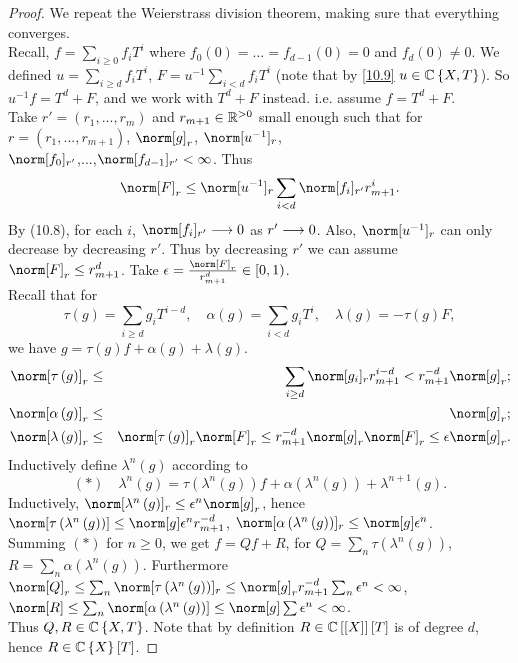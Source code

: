 \begin{proof}
We repeat the Weierstrass division theorem, making sure that everything
converges.\\
Recall, $f=\sum_{i\geq0}f_{i}T^{i}$ where $f_{0}\left(0\right)=...=f_{d-1}\left(0\right)=0$
and $f_{d}\left(0\right)\neq0$. We defined $u=\sum_{i\geq d}f_{i}T^{i}$,
$F=u^{-1}\sum_{i<d}f_{i}T^{i}$ (note that by \ref{10.9} $u\in\mathbb{C}\left\{ X,T\right\} $).
So $u^{-1}f=T^{d}+F$, and we work with $T^{d}+F$ instead. i.e. assume
$f=T^{d}+F$.\\
Take $r'=\left(r_{1},...,r_{m}\right)$ and $r_{m+1}\in\mathbb{R}^{>0}$ small
enough such that for $r=\left(r_{1},...,r_{m+1}\right)$, $\norm[g]_{r}$,
$\norm[u^{-1}]_{r}$, \\
$\norm[f_{0}]_{r'}$,...,$\norm[f_{d-1}]_{r'}<\infty$. Thus 
\[
\norm[F]_{r}\leq\norm[u^{-1}]_{r}\sum_{i<d}\norm[f_{i}]_{r'}r_{m+1}^{i}.
\]
By (10.8), for each $i$, $\norm[f_{i}]_{r'}\lto0$ as $r'\longrightarrow0$.
Also, $\norm[u^{-1}]_{r}$ can only decrease by decreasing $r'$.
Thus by decreasing $r'$ we can assume $\norm[F]_{r}\leq r_{m+1}^{d}$.
Take $\epsilon=\frac{\norm[F]_{r}}{r_{m+1}^{d}}\in\left[0,1\right)$.
\\
Recall that for 
\[
\tau\left(g\right)=\sum_{i\geq d}g_{i}T^{i-d},\quad\alpha\left(g\right)=\sum_{i<d}g_{i}T^{i},\quad\lambda\left(g\right)=-\tau\left(g\right)F,
\]
we have $g=\tau\left(g\right)f+\alpha\left(g\right)+\lambda\left(g\right)$.
\begin{eqnarray*}
\norm[\tau\left(g\right)]_{r} & \leq & \sum_{i\geq d}\norm[g_{i}]_{r}r_{m+1}^{i-d}<r_{m+1}^{-d}\norm[g]_{r};\\
\norm[\alpha\left(g\right)]_{r} & \leq & \norm[g]_{r};\\
\norm[\lambda\left(g\right)]_{r} & \leq & \norm[\tau\left(g\right)]_{r}\norm[F]_{r}\leq r_{m+1}^{-d}\norm[g]_{r}\norm[F]_{r}\leq\epsilon\norm[g]_{r}.
\end{eqnarray*}
Inductively define $\lambda^{n}\left(g\right)$ according to 
\[
\left(\ast\right)\quad\lambda^{n}\left(g\right)=\tau\left(\lambda^{n}\left(g\right)\right)f+\alpha\left(\lambda^{n}\left(g\right)\right)+\lambda^{n+1}\left(g\right).
\]
Inductively, $\norm[\lambda^{n}\left(g\right)]_{r}\leq\epsilon^{n}\norm[g]_{r}$,
hence $\norm[\tau\left(\lambda^{n}\left(g\right)\right)]\leq\norm[g]\epsilon^{n}r_{m+1}^{-d}$,
$\norm[\alpha\left(\lambda^{n}\left(g\right)\right)]_{r}\leq\norm[g]\epsilon^{n}$.\\
Summing $\left(\ast\right)$ for $n\geq0$, we get $f=Qf+R$, for
$Q=\sum_{n}\tau\left(\lambda^{n}\left(g\right)\right)$, $R=\sum_{n}\alpha\left(\lambda^{n}\left(g\right)\right)$.
Furthermore $\norm[Q]_{r}\leq\sum_{n}\norm[\tau\left(\lambda^{n}\left(g\right)\right)]_{r}\leq\norm[g]_{r}r_{m+1}^{-d}\sum_{n}\epsilon^{n}<\infty$,
$\norm[R]\leq\sum_{n}\norm[\alpha\left(\lambda^{n}\left(g\right)\right)]\leq\norm[g]\sum\epsilon^{n}<\infty$.
\\
Thus $Q,R\in\mathbb{C}\left\{ X,T\right\} $. Note that by definition $R\in\mathbb{C}\left[\left[X\right]\right]\left[T\right]$
is of degree $d$, hence $R\in\mathbb{C}\left\{ X\right\} \left[T\right]$.\end{proof}

